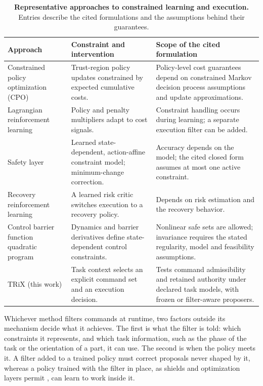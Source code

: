 \documentclass[12pt]{article}
\begin{document}
\begin{table}[!tbp]
\centering\small
\caption{\textbf{Representative approaches to constrained learning and execution.}
Entries describe the cited formulations and the assumptions behind their
guarantees.}
\label{tab:submitted-1}
\setlength{\tabcolsep}{5pt}
\renewcommand{\arraystretch}{1.12}
\begin{tabular}{@{}L{1.22in}L{2.40in}L{2.52in}@{}}
\toprule
Approach & Constraint and intervention & Scope of the cited formulation\\
\midrule
Constrained policy optimization (CPO) \cite{ref16} & Trust-region policy updates constrained by expected cumulative costs. & Policy-level cost guarantees depend on constrained Markov decision process assumptions and update approximations.\\
\addlinespace
Lagrangian reinforcement learning \cite{ref18,ref19,ref20} & Policy and penalty multipliers adapt to cost signals. & Constraint handling occurs during learning; a separate execution filter can be added.\\
\addlinespace
Safety layer \cite{ref21} & Learned state-dependent, action-affine constraint model; minimum-change correction. & Accuracy depends on the model; the cited closed form assumes at most one active constraint.\\
\addlinespace
Recovery reinforcement learning \cite{ref22} & A learned risk critic switches execution to a recovery policy. & Depends on risk estimation and the recovery behavior.\\
\addlinespace
Control barrier function quadratic program \cite{ref23,ref24} & Dynamics and barrier derivatives define state-dependent control constraints. & Nonlinear safe sets are allowed; invariance requires the stated regularity, model and feasibility assumptions.\\
\addlinespace
TRiX (this work) & Task context selects an explicit command set and an execution decision. & Tests command admissibility and retained authority under declared task models, with frozen or filter-aware proposers.\\
\bottomrule
\end{tabular}
\end{table}

Whichever method filters commands at runtime, two factors outside its
mechanism decide what it achieves. The first is what the filter is told: which
constraints it represents, and which task information, such as the phase of
the task or the orientation of a part, it can use. The second is when the
policy meets it. A filter added to a trained policy must correct proposals
never shaped by it, whereas a policy trained with the filter in place, as
shields and optimization layers permit \cite{ref42,ref43}, can learn to work
inside it.
\end{document}
